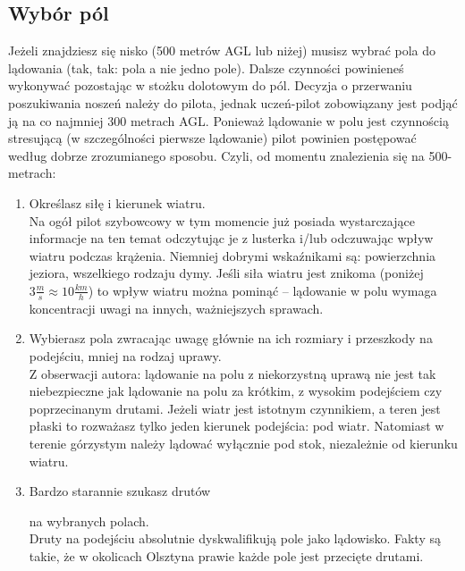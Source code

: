 \documentclass{article}
\begin{document}
\subsection{Wybór pól}
Jeżeli znajdziesz się nisko (500 metrów AGL lub niżej) musisz wybrać pola
do lądowania (tak, tak: pola a nie jedno pole). Dalsze czynności powinieneś
wykonywać pozostając w stożku dolotowym do pól. Decyzja o przerwaniu
poszukiwania noszeń należy do pilota, jednak uczeń-pilot zobowiązany jest
podjąć ją na co najmniej 300 metrach AGL. Ponieważ lądowanie w polu 
jest czynnością stresującą (w szczególności pierwsze lądowanie)
pilot powinien postępować według dobrze zrozumianego
sposobu. Czyli, od momentu znalezienia się na 500-metrach:
\begin{enumerate}
\item Określasz siłę i kierunek wiatru. \\
    Na ogół pilot szybowcowy w tym momencie już posiada
    wystarczające informacje na ten temat odczytując je z lusterka i/lub
    odczuwając wpływ wiatru podczas krążenia. Niemniej dobrymi wskaźnikami są:
    powierzchnia jeziora, wszelkiego rodzaju dymy. Jeśli siła wiatru jest
    znikoma (poniżej $3\frac{m}{s} \approx 10\frac{km}{h}$) to wpływ
    wiatru można pominąć -- lądowanie w polu wymaga koncentracji uwagi
    na innych, ważniejszych sprawach.

\item Wybierasz pola zwracając uwagę głównie na ich rozmiary i przeszkody na
    podejściu, mniej na rodzaj uprawy.\\
    Z obserwacji autora: lądowanie
    na polu z niekorzystną uprawą nie jest tak niebezpieczne jak lądowanie
    na polu za krótkim, z wysokim podejściem czy poprzecinanym drutami.
    Jeżeli wiatr jest istotnym czynnikiem, a teren jest płaski
    to rozważasz tylko jeden kierunek podejścia: pod wiatr. Natomiast
    w terenie górzystym należy lądować wyłącznie pod stok, niezależnie
    od kierunku wiatru.

\item \begin{bf}Bardzo starannie szukasz drutów\end{bf} na wybranych
    polach.\\
    Druty na podejściu absolutnie dyskwalifikują pole jako lądowisko.
    Fakty są takie, że w okolicach Olsztyna prawie każde pole jest
    przecięte drutami.


\end{enumerate}
\end{document}
